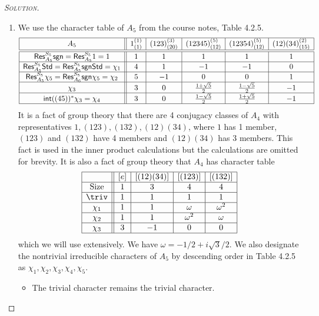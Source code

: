 \begin{proof}[{\scshape Solution}]
\begin{enumerate}[font=\normalfont,label=\textbf{(\Alph*)}, wide]
    \item We use the character table of $A_5$ from the course notes, Table 4.2.5.
    \[
    \begin{array}{|c||c|c|c|c|c|}
    \hline A_{5} & 1_{(1)}^{(1)} & (123)_{(20)}^{(3)} & (12345)_{(12)}^{(5)} & (12354)_{(12)}^{(5)} & (12)(34)_{(15)}^{(2)} \\
    \hline \hline \mathsf{Res}_{A_{5}}^{S_{5}} \mathsf{sgn}=\mathsf{Res}_{A_{5}}^{S_{5}} 1=1 & 1 & 1 & 1 & 1 & 1 \\
    \hline \mathsf{Res}_{A_{5}}^{S_{5}} \mathsf{Std}=\mathsf{Res}_{A_{5}}^{S_{5}} \mathsf{sgn} \mathsf{Std}=\chi_{1} & 4 & 1 & -1 & -1 & 0 \\
    \hline \mathsf{Res}_{A_{5}}^{S_{5}} \chi_{5}=\mathsf{Res}_{A_{6}}^{S_{5}} \mathsf{sgn} \chi_{5}=\chi_{2} & 5 & -1 & 0 & 0 & 1 \\
    \hline \chi_{3} & 3 & 0 & \frac{1+\sqrt{5}}{2} & \frac{1-\sqrt{5}}{2} & -1 \\
    \hline \mathsf{int}((45))^{*} \chi_{3}=\chi_{4} & 3 & 0 & \frac{1-\sqrt{5}}{2} & \frac{1+\sqrt{5}}{2} & -1 \\
    \hline
    \end{array}
    \]
    It is a fact of group theory that there are 4 conjugacy classes of $A_4$ with representatives $1, (123), (132), (12)(34)$, where $1$ has 1 member, $(123)$ and $(132)$ have 4 members and $(12)(34)$ has 3 members. This fact is used in the inner product calculations but the calculations are omitted for brevity. It is also a fact of group theory that $A_4$ has character table
    \[
    \begin{array}{|c||c|c|c|c|}
      \hline & {[e]} & {[(12)(34)]} & {[(123)]} & {[(132)]} \\
      \hline \text { Size } & 1 & 3 & 4 & 4 \\
      \hline \triv & 1 & 1 & 1 & 1 \\
      \hline \chi_{1} & 1 & 1 & \omega & \omega^{2} \\
      \hline \chi_{2} & 1 & 1 & \omega^{2} & \omega \\
      \hline \chi_{3} & 3 & -1 & 0 & 0 \\
      \hline
    \end{array}
    \]
    which we will use extensively. We have $\omega = -1/2 + i\sqrt{3}/2$. We also designate the nontrivial irreducible characters of $A_5$ by descending order in Table 4.2.5 as $\chi_1, \chi_2, \chi_3,\chi_4,\chi_5$.
      \begin{itemize}
        \item The trivial character remains the trivial character.


\end{itemize}
\end{enumerate}
\end{proof}
